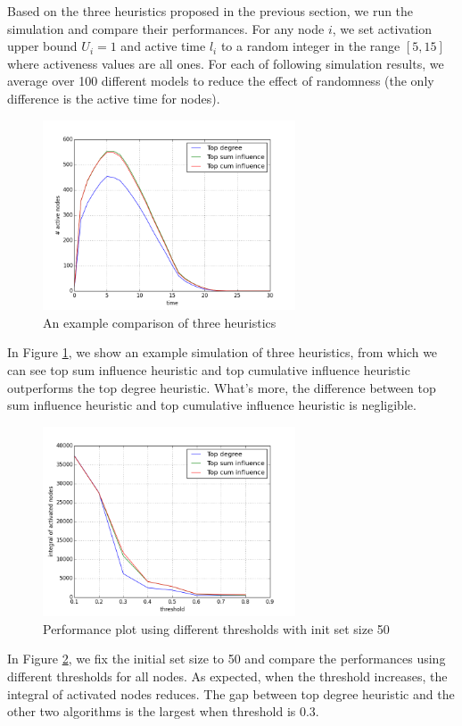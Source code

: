 \documentclass{article}
\begin{document}
Based on the three heuristics proposed in the previous section, we run the simulation and compare their performances. For any node $i$, we set activation upper bound $U_i = 1$ and active time $l_i$ to a random integer in the range $[5, 15]$ where activeness values are all ones. For each of following simulation results, we average over 100 different models to reduce the effect of randomness (the only difference is the active time for nodes).

\begin{figure}[!htbp]
\centering
\includegraphics[width=7.5cm]{yzplot5.png}
\caption{An example comparison of three heuristics}
\label{example}
\end{figure}

In Figure \ref{example}, we show an example simulation of three heuristics, from which we can see top sum influence heuristic and top cumulative influence heuristic outperforms the top degree heuristic. What's more, the difference between top sum influence heuristic and top cumulative influence heuristic is negligible.

\begin{figure}[!htbp]
\centering
\includegraphics[width=7.5cm]{yzplot6.png}
\caption{Performance plot using different thresholds with init set size 50}
\label{pthreshold}
\end{figure}

In Figure \ref{pthreshold}, we fix the initial set size to 50 and compare the performances using different thresholds for all nodes. As expected, when the threshold increases, the integral of activated nodes reduces. The gap between top degree heuristic and the other two algorithms is the largest when threshold is 0.3.
\end{document}

